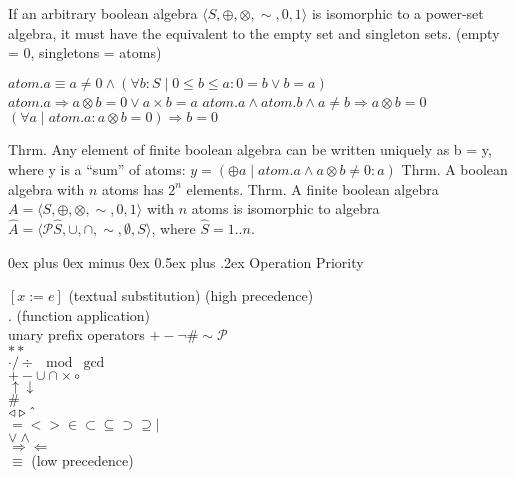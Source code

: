 \documentclass[letterpaper, 8pt]{extarticle}
\makeatletter
\renewcommand{\section}{\@startsection{section}{1}{0mm}%
                                {0ex plus 0ex minus 0ex}%
                                {0.5ex plus .2ex}%
                                {\normalfont\normalsize\bfseries}}
\newcommand{\To}{\Rightarrow}
\makeatother
\begin{document}
\begin{multicols*}{3}
    If an arbitrary boolean algebra $\langle S, \oplus, \otimes, \sim, 0, 1\rangle$ is
    isomorphic to a power-set algebra, it must have the equivalent to the empty set and singleton sets.
    (empty = 0, singletons = atoms)

    $atom.a \equiv a \neq 0 \land (\forall b : S \mid 0 \leq b \leq a : 0 = b \lor b = a)$
    $atom.a \To a \otimes b = 0 \lor a \times b = a$
    $atom.a \land atom.b \land a \neq b \To a \otimes b = 0$
    $(\forall a \mid atom.a : a \otimes b = 0) \To b = 0$

    Thrm. Any element of finite boolean algebra can be written uniquely as
    b = y, where y is a ``sum'' of atoms:
    $y = (\oplus a \mid atom.a \land a \otimes b \neq 0 : a)$
    Thrm. A boolean algebra with $n$ atoms has $2^n$ elements.
    Thrm. A finite boolean algebra $A = \langle S, \oplus, \otimes, \sim, 0, 1 \rangle$
    with $n$ atoms is isomorphic to algebra $\hat{A} = \langle \mathcal{P} \hat{S}, \cup, \cap, \sim, \emptyset, S \rangle$, where
    $\hat{S} = 1..n$.




    \section{Operation Priority}
    \begin{multicols}{2}
        $[x := e]$ (textual substitution) (high precedence) \\
        $.$ (function application) \\
        unary prefix operators $+ - \neg \# \sim \mathcal{P}$ \\
        $**$ \\
        $\cdot / \div \mod \gcd$ \\
        $+ - \cup \cap \times \circ$ \\
        $\uparrow \downarrow$ \\
        $\#$ \\
        $\triangleleft \triangleright \string^$ \\
        $= < > \in \subset \subseteq \supset \supseteq \mid$ \\
        $\lor \land$ \\
        $\Rightarrow \Leftarrow$ \\
        $\equiv$ (low precedence)
    \end{multicols}


\end{multicols*}
\end{document}
